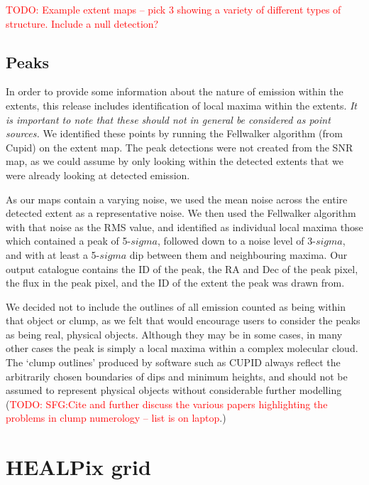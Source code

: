 \documentclass[twocolumn]{aastex6}
\newcommand{\todo}[1]{\textcolor{red}{TODO: #1}}
\begin{document}
\todo{Example extent maps -- pick 3 showing a variety of different
  types of structure. Include a null detection?}

\subsection{Peaks}
In order to provide some information about the nature of emission
within the extents, this release includes identification of local
maxima within the extents. \emph{It is important to note that these
  should not in general be considered as point sources.} We identified
these points by running the Fellwalker algorithm (from Cupid) on the
extent map. The peak detections were not created from the SNR map, as
we could assume by only looking within the detected extents that we
were already looking at detected emission.

As our maps contain a varying noise, we used the mean noise across the
entire detected extent as a representative noise. We then used the
Fellwalker algorithm with that noise as the RMS value, and identified
as individual local maxima those which contained a peak of 5-$sigma$,
followed down to a noise level of 3-$sigma$, and with at least a
5-$sigma$ dip between them and neighbouring maxima. Our output
catalogue contains the ID of the peak, the RA and Dec of the peak
pixel, the flux in the peak pixel, and the ID of the extent the peak
was drawn from.

We decided not to include the outlines of all emission counted as
being within that object or clump, as we felt that would encourage
users to consider the peaks as being real, physical objects. Although
they may be in some cases, in many other cases the peak is simply a
local maxima within a complex molecular cloud. The `clump outlines'
produced by software such as CUPID always reflect the arbitrarily
chosen boundaries of dips and minimum heights, and should not be
assumed to represent physical objects without considerable further
modelling (\todo{SFG:Cite and further discuss the various papers
  highlighting the problems in clump numerology -- list is on
  laptop}.)


\section{HEALPix grid}
\label{sec:healpix}
\end{document}
